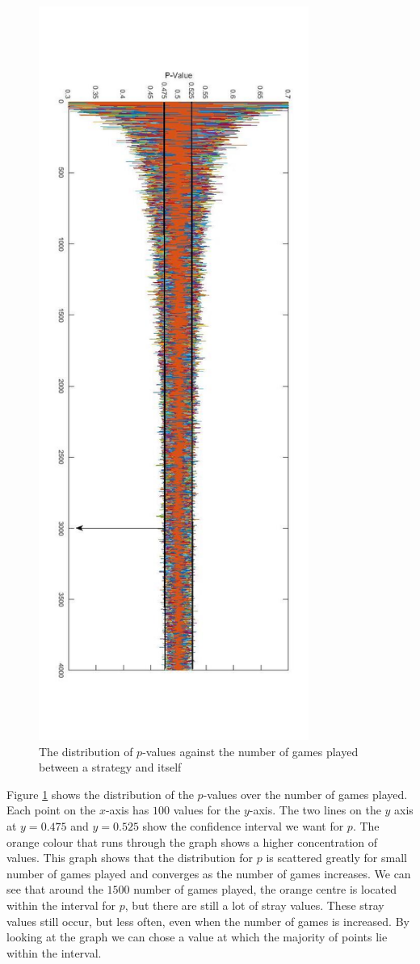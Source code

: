 \documentclass[a4paper,titlepage]{article}
\begin{document}
\begin{figure}
\centering
\includegraphics[height=24cm]{stats_testing}
\caption{The distribution of $p$-values against the number of games played between a strategy and itself\label{figure15}}
\end{figure}
Figure \ref{figure15} shows the distribution of the $p$-values over the number of games played. Each point on the $x$-axis has $100$ values for the $y$-axis. The two lines on the $y$ axis at $y=0.475$ and $y=0.525$ show the confidence interval we want for $p$. The orange colour that runs through the graph shows a higher concentration of values. This graph shows that the distribution for $p$ is scattered greatly for small number of games played and converges as the number of games increases. We can see that around the $1500$ number of games played, the orange centre is located within the interval for $p$, but there are still a lot of stray values. These stray values still occur, but less often, even when the number of games is increased. By looking at the graph we can chose a value at which the majority of points lie within the interval.
\end{document}
